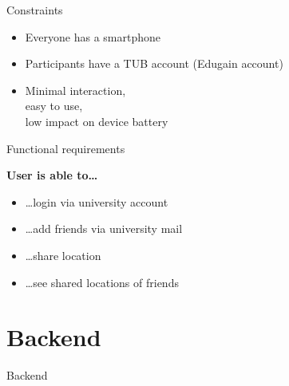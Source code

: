 \documentclass[11pt]{beamer}
\begin{document}
\begin{frame}{Constraints}
  \pause
  \begin{itemize}

    \item Everyone has a smartphone
    \pause
  	\item Participants have a TUB account (Edugain account)
    \pause
  	\item Minimal interaction,\\easy to use,\\low impact on device battery

  \end{itemize}

\end{frame}


\begin{frame}{Functional requirements}

  \textbf{User is able to\ldots}

  \vspace{0.25cm}
  \pause
  \begin{itemize}
    \item \ldots login via university account
    \pause
    \item \ldots add friends via university mail
    \pause
    \item \ldots share location
    \pause
    \item \ldots see shared locations of friends
  \end{itemize}

\end{frame}


\section{Backend}

\begin{frame}{}

  \begin{center}

    {\Huge Backend}

  \end{center}

\end{frame}
\end{document}
